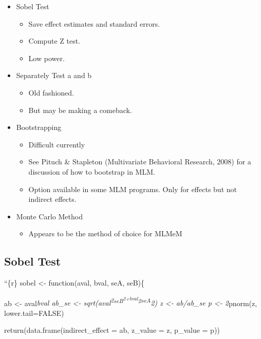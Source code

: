 \documentclass[
  english,
  man,floatsintext]{apa6}
\providecommand{\tightlist}{%
  \setlength{\itemsep}{0pt}\setlength{\parskip}{0pt}}
\begin{document}
\begin{itemize}
\tightlist
\item
  Sobel Test

  \begin{itemize}
  \tightlist
  \item
    Save effect estimates and standard errors.
  \item
    Compute Z test.
  \item
    Low power.
  \end{itemize}
\item
  Separately Test a and b

  \begin{itemize}
  \tightlist
  \item
    Old fashioned.
  \item
    But may be making a comeback.
  \end{itemize}
\item
  Bootstrapping

  \begin{itemize}
  \tightlist
  \item
    Difficult currently
  \item
    See Pituch \& Stapleton (Multivariate Behavioral Research, 2008) for a discussion of how to bootstrap in MLM.
  \item
    Option available in some MLM programs. Only for effects but not indirect effects.
  \end{itemize}
\item
  Monte Carlo Method

  \begin{itemize}
  \tightlist
  \item
    Appears to be the method of choice for MLMeM
  \end{itemize}
\end{itemize}

\hypertarget{sobel-test}{%
\subsection{Sobel Test}\label{sobel-test}}

``\{r\}
sobel \textless- function(aval, bval, seA, seB)\{

ab \textless- aval\emph{bval
ab\_se \textless- sqrt(aval\textsuperscript{2\emph{seB\textsuperscript{2+bval}2}seA}2)
z \textless- ab/ab\_se
p \textless- 2}pnorm(z, lower.tail=FALSE)

return(data.frame(indirect\_effect = ab, z\_value = z, p\_value = p))
\end{document}
